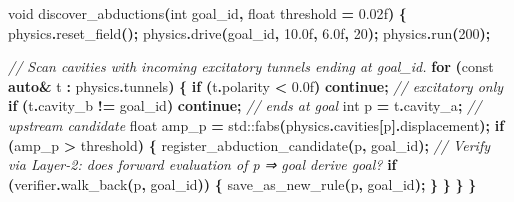 \documentclass[
  11pt,
  a4paper,
]{article}
\newenvironment{Shaded}{\begin{snugshade}}{\end{snugshade}}
\newcommand{\AttributeTok}[1]{\textcolor[rgb]{0.13,0.29,0.53}{#1}}
\newcommand{\BuiltInTok}[1]{#1}
\newcommand{\CommentTok}[1]{\textcolor[rgb]{0.56,0.35,0.01}{\textit{#1}}}
\newcommand{\ControlFlowTok}[1]{\textcolor[rgb]{0.13,0.29,0.53}{\textbf{#1}}}
\newcommand{\DataTypeTok}[1]{\textcolor[rgb]{0.13,0.29,0.53}{#1}}
\newcommand{\DecValTok}[1]{\textcolor[rgb]{0.00,0.00,0.81}{#1}}
\newcommand{\FloatTok}[1]{\textcolor[rgb]{0.00,0.00,0.81}{#1}}
\newcommand{\KeywordTok}[1]{\textcolor[rgb]{0.13,0.29,0.53}{\textbf{#1}}}
\newcommand{\NormalTok}[1]{#1}
\newcommand{\OperatorTok}[1]{\textcolor[rgb]{0.81,0.36,0.00}{\textbf{#1}}}
\begin{document}
\begin{Shaded}
\begin{Highlighting}[]
\DataTypeTok{void}\NormalTok{ discover\_abductions}\OperatorTok{(}\DataTypeTok{int}\NormalTok{ goal\_id}\OperatorTok{,} \DataTypeTok{float}\NormalTok{ threshold }\OperatorTok{=} \FloatTok{0.02}\BuiltInTok{f}\OperatorTok{)} \OperatorTok{\{}
\NormalTok{    physics}\OperatorTok{.}\NormalTok{reset\_field}\OperatorTok{();}
\NormalTok{    physics}\OperatorTok{.}\NormalTok{drive}\OperatorTok{(}\NormalTok{goal\_id}\OperatorTok{,} \FloatTok{10.0}\BuiltInTok{f}\OperatorTok{,} \FloatTok{6.0}\BuiltInTok{f}\OperatorTok{,} \DecValTok{20}\OperatorTok{);}
\NormalTok{    physics}\OperatorTok{.}\NormalTok{run}\OperatorTok{(}\DecValTok{200}\OperatorTok{);}

    \CommentTok{// Scan cavities with incoming excitatory tunnels ending at goal\_id.}
    \ControlFlowTok{for} \OperatorTok{(}\AttributeTok{const} \KeywordTok{auto}\OperatorTok{\&}\NormalTok{ t }\OperatorTok{:}\NormalTok{ physics}\OperatorTok{.}\NormalTok{tunnels}\OperatorTok{)} \OperatorTok{\{}
        \ControlFlowTok{if} \OperatorTok{(}\NormalTok{t}\OperatorTok{.}\NormalTok{polarity }\OperatorTok{\textless{}} \FloatTok{0.0}\BuiltInTok{f}\OperatorTok{)} \ControlFlowTok{continue}\OperatorTok{;}                  \CommentTok{// excitatory only}
        \ControlFlowTok{if} \OperatorTok{(}\NormalTok{t}\OperatorTok{.}\NormalTok{cavity\_b }\OperatorTok{!=}\NormalTok{ goal\_id}\OperatorTok{)} \ControlFlowTok{continue}\OperatorTok{;}              \CommentTok{// ends at goal}
        \DataTypeTok{int}\NormalTok{ p }\OperatorTok{=}\NormalTok{ t}\OperatorTok{.}\NormalTok{cavity\_a}\OperatorTok{;}                                \CommentTok{// upstream candidate}
        \DataTypeTok{float}\NormalTok{ amp\_p }\OperatorTok{=} \BuiltInTok{std::}\NormalTok{fabs}\OperatorTok{(}\NormalTok{physics}\OperatorTok{.}\NormalTok{cavities}\OperatorTok{[}\NormalTok{p}\OperatorTok{].}\NormalTok{displacement}\OperatorTok{);}
        \ControlFlowTok{if} \OperatorTok{(}\NormalTok{amp\_p }\OperatorTok{\textgreater{}}\NormalTok{ threshold}\OperatorTok{)} \OperatorTok{\{}
\NormalTok{            register\_abduction\_candidate}\OperatorTok{(}\NormalTok{p}\OperatorTok{,}\NormalTok{ goal\_id}\OperatorTok{);}
            \CommentTok{// Verify via Layer{-}2: does forward evaluation of p ⇒ goal derive goal?}
            \ControlFlowTok{if} \OperatorTok{(}\NormalTok{verifier}\OperatorTok{.}\NormalTok{walk\_back}\OperatorTok{(}\NormalTok{p}\OperatorTok{,}\NormalTok{ goal\_id}\OperatorTok{))} \OperatorTok{\{}
\NormalTok{                save\_as\_new\_rule}\OperatorTok{(}\NormalTok{p}\OperatorTok{,}\NormalTok{ goal\_id}\OperatorTok{);}
            \OperatorTok{\}}
        \OperatorTok{\}}
    \OperatorTok{\}}
\OperatorTok{\}}
\end{Highlighting}
\end{Shaded}
\end{document}
